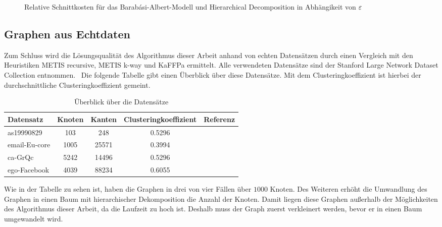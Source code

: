\begin{figure}[H]
    \centering
    
    \caption{Relative Schnittkosten für das Barabási-Albert-Modell und Hierarchical Decomposition in Abhängikeit von $\varepsilon$\label{fig:prefattachhdecompimb}}
\end{figure}

\subsection{Graphen aus Echtdaten}
Zum Schluss wird die Lösungsqualität des Algorithmus dieser Arbeit anhand von echten Datensätzen durch einen Vergleich mit den Heuristiken METIS recursive, METIS k-way und KaFFPa ermittelt.
Alle verwendeten Datensätze sind der Stanford Large Network Dataset Collection entnommen.~\cite{LK14}
Die folgende Tabelle gibt einen Überblick über diese Datensätze.
Mit dem Clusteringkoeffizient ist hierbei der durchschnittliche Clusteringkoeffizient gemeint.

\vspace{0.5cm}
\begin{table}[H]
    \footnotesize
    \centering
    \begin{tabular}{lcccc}
        \toprule
        Datensatz & Knoten & Kanten & Clusteringkoeffizient & Referenz \\
        \midrule
        as19990829 & 103 & 248 & 0.5296 & \cite{LKF05} \\
        email-Eu-core & 1005 & 25571 & 0.3994 & \cite{LKF07} \\
        ca-GrQc & 5242 & 14496 & 0.5296 & \cite{LKF07} \\
        ego-Facebook & 4039 & 88234 & 0.6055 & \cite{ML14} \\
        \bottomrule
    \end{tabular}
    \caption{Überblick über die Datensätze}
\end{table}

Wie in der Tabelle zu sehen ist, haben die Graphen in drei von vier Fällen über $1000$ Knoten.
Des Weiteren erhöht die Umwandlung des Graphen in einen Baum mit hierarchischer Dekomposition die Anzahl der Knoten. 
Damit liegen diese Graphen außerhalb der Möglichkeiten des Algorithmus dieser Arbeit, da die Laufzeit zu hoch ist.
Deshalb muss der Graph zuerst verkleinert werden, bevor er in einen Baum umgewandelt wird.

